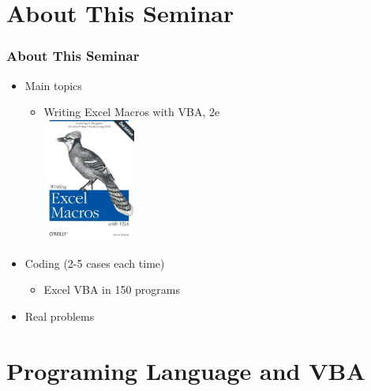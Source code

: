 \documentclass[13pt]{beamer}
\begin{document}
\section{About This Seminar}
\begin{frame}[t]\frametitle{About This Seminar}
\begin{itemize}
  \item Main topics 
  \begin{itemize}
    \item Writing Excel Macros with VBA, 2e \\
    \includegraphics[width=0.25\textwidth]{Reilly.jpg}
    
  \end{itemize}
  \item Coding (2-5 cases each time)
    \begin{itemize}
     \item Excel VBA in 150 programs
    \end{itemize}
  \item Real problems

\end{itemize}
  
\end{frame}

\section{Programing Language and VBA}
\end{document}
